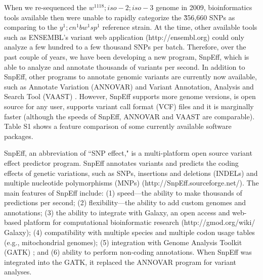 When we re-sequenced the $w^{1118} ; iso-2; iso-3$ genome in 2009, \cite{platts2009massively} bioinformatics tools available then were unable to rapidly categorize the \~356,660 SNPs as comparing to the $y^1 ; cn^1 bw^1 sp^1$ reference strain. At the time, other available tools such as ENSEMBL’s variant web application (http://ensembl.org) could only analyze a few hundred to a few thousand SNPs per batch. Therefore, over the past couple of years, we have been developing a new program, SnpEff, which is able to analyze and annotate thousands of variants per second. In addition to SnpEff, other programs to annotate genomic variants are currently now available, such as Annotate Variation (ANNOVAR) \cite{wang2010annovar} and Variant Annotation, Analysis and Search Tool (VAAST) \cite{rope2011using}. However, SnpEff supports more genome versions, is open source for any user, supports variant call format (VCF) files and it is marginally faster (although the speeds of SnpEff, ANNOVAR and VAAST are comparable). Table S1 shows a feature comparison of some currently available software packages.

SnpEff, an abbreviation of ``SNP effect," is a multi-platform open source variant effect predictor program. SnpEff annotates variants and predicts the coding effects of genetic variations, such as SNPs, insertions and deletions (INDELs) and multiple nucleotide polymorphisms (MNPs) (http://SnpEff.sourceforge.net/).  The main features of SnpEff include: (1) speed—the ability to make thousands of predictions per second; (2) flexibility—the ability to add custom genomes and annotations; (3) the ability to integrate with Galaxy, an open access and web-based platform for computational bioinformatic research (http://gmod.org/wiki/ Galaxy); (4) compatibility with multiple species and multiple codon usage tables (e.g., mitochondrial genomes); (5) integration with Genome Analysis Toolkit (GATK) \cite{mckenna2010genome}; and (6) ability to perform non-coding annotations. When SnpEff was integrated into the GATK, it replaced the ANNOVAR program for variant analyses.


